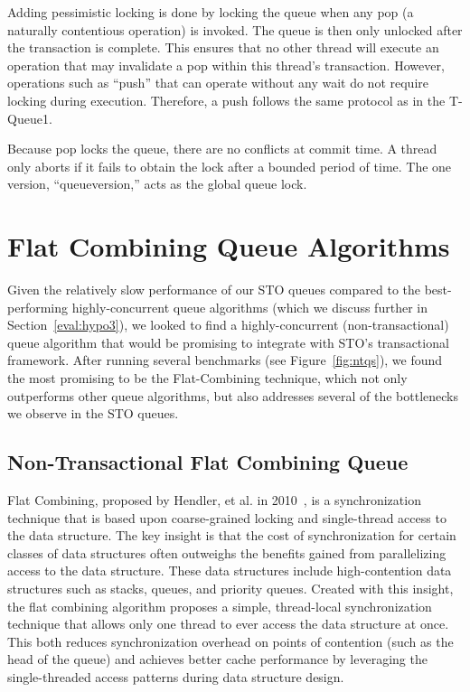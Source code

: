 Adding pessimistic locking is done by locking the queue when any pop (a naturally contentious operation) is invoked. The queue is then only unlocked after the transaction is complete. This ensures that no other thread will execute an operation that may invalidate a pop within this thread's transaction. However, operations such as ``push'' that can operate without any wait do not require locking during execution. Therefore, a push follows the same protocol as in the T-Queue1.

Because pop locks the queue, there are no conflicts at commit time. A thread only aborts if it fails to obtain the lock after a bounded period of time. The one version, “queueversion,” acts as the global queue lock. 


\section{Flat Combining Queue Algorithms}
Given the relatively slow performance of our STO queues compared to the best-performing highly-concurrent queue algorithms (which we discuss further in Section~\ref{eval:hypo3}), we looked to find a highly-concurrent (non-transactional) queue algorithm that would be promising to integrate with STO's transactional framework. After running several benchmarks (see Figure~\ref{fig:ntqs}), we found the most promising to be the Flat-Combining technique, which not only outperforms other queue algorithms, but also addresses several of the bottlenecks we observe in the STO queues.

\subsection{Non-Transactional Flat Combining Queue}
\label{fcqueuent}

Flat Combining, proposed by Hendler, et al. in 2010~\cite{flatcombining}, is a synchronization technique that is based upon coarse-grained locking and single-thread access to the data structure. The key insight is that the cost of synchronization for certain classes of data structures often outweighs the benefits gained from parallelizing access to the data structure. These data structures include high-contention data structures such as stacks, queues, and priority queues. Created with this insight, the flat combining algorithm proposes a simple, thread-local synchronization technique that allows only one thread to ever access the data structure at once. This both reduces synchronization overhead on points of contention (such as the head of the queue) and achieves better cache performance by leveraging the single-threaded access patterns during data structure design.

